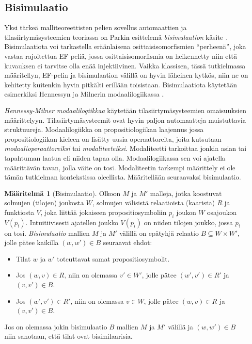 \documentclass[finnish]{tktltiki2}
\theoremstyle{definition}
\newtheorem{maar}[lau]{Määritelmä}
\theoremstyle{remark}
\begin{document}
\subsection{Bisimulaatio}
Yksi tärkeä malliteoreettisten pelien sovellus automaattien ja tilasiirtymäsysteemien teoriassa on Parkin esittelemä \textit{bisimulaation} käsite \cite{Par81}. Bisimulaatiota voi tarkastella eräänlaisena osittaisisomorfismien ``perheenä'', joka vastaa rajoitettua EF-peliä, jossa osittaisisomorfismia on heikennetty niin että kuvauksen ei tarvitse olla enää injektiivinen. Vaikka klassisen, tässä tutkielmassa määritellyn, EF-pelin ja bisimulaation välillä on hyvin läheinen kytkös, niin ne on kehitetty kuitenkin hyvin pitkälti erillään toisistaan. Bisimulaatiota käytetään esimerkiksi Hennessyn ja Milnerin modaalilogiikassa \cite{Hen80}. 

\textit{Hennessy-Milner modaalilogiikkaa} käytetään tilasiirtymäsysteemien omaisuuksien määrittelyyn. Tilasiirtymäsysteemit ovat hyvin paljon automaatteja muistuttavia struktuureja. Modaalilogiikka on propositiologiikan laajennus jossa propositiologiikan kieleen on lisätty uusia operaattoreita, joita kutsutaan \textit{modaalioperaattoreiksi} tai \textit{modaliteeteiksi}. Modaliteetti tarkoittaa jonkin asian tai tapahtuman laatua eli niiden tapaa olla. Modaalilogiikassa sen voi ajatella määrittävän tavan, jolla väite on tosi. Modaliteetin tarkempi määrittely ei ole tämän tutkielman kontekstissa oleellista. Määritellään seuraavaksi bisimulaatio.

\begin{maar}[Bisimulaatio]
Olkoon $M$ ja $M'$ malleja, jotka koostuvat solmujen (tilojen) joukosta $W$, solmujen välisistä relaatioista (kaarista) $R$ ja funktiosta $V$, joka liittää jokaiseen propositiosymboliin $p_i$ joukon $W$ osajoukon $V(p_i)$. Intuitiivisesti ajatellen joukko $V(p_i)$ on niiden tilojen joukko, jossa $p_i$ on tosi. \textit{Bisimulaatio} mallien $M$ ja $M'$ välillä on epätyhjä relaatio $B \subseteq W \times W'$, jolle pätee kaikilla $(w, w') \in B$ seuraavat ehdot:
\begin{itemize}
\item Tilat $w$ ja $w'$ toteuttavat samat propositiosymbolit.
\item Jos $(w, v) \in R$, niin on olemassa $v' \in W'$, jolle pätee $(w', v') \in R'$ ja $(v, v') \in B$.
\item Jos $(w', v') \in R'$, niin on olemassa $v \in W$, jolle pätee $(w, v) \in R$ ja $(v, v') \in B$.
\end{itemize}
Jos on olemassa jokin bisimulaatio $B$ mallien $M$ ja $M'$ välillä ja $(w, w') \in B$ niin sanotaan, että tilat ovat bisimilaarisia.
\end{maar}
\end{document}
